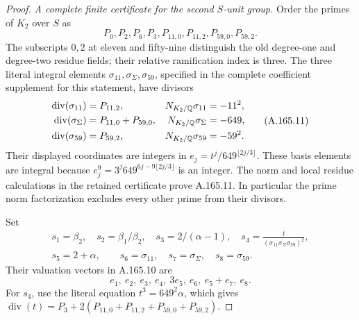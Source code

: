 \begin{proof}
\emph{A complete finite certificate for the second \(S\)-unit group.}
Order the primes of \(K_2\) over \(S\) as
\[
  P_0,P_2,P_6,P_3,P_{11,0},P_{11,2},P_{59,0},P_{59,2}.
\tag{A.165.10}
\]
The subscripts \(0,2\) at eleven and fifty-nine distinguish the old
degree-one and degree-two residue fields; their relative ramification
index is three.
The three literal integral elements
\(\sigma_{11},\sigma_\Sigma,\sigma_{59}\), specified in the complete
coefficient supplement for this statement, have divisors
\[
 \begin{aligned}
 \operatorname{div}(\sigma_{11})&=P_{11,2},&
 N_{K_2/\mathbb Q}\sigma_{11}&=-11^2,\\
 \operatorname{div}(\sigma_\Sigma)&=P_{11,0}+P_{59,0},&
 N_{K_2/\mathbb Q}\sigma_\Sigma&=-649,\\
 \operatorname{div}(\sigma_{59})&=P_{59,2},&
 N_{K_2/\mathbb Q}\sigma_{59}&=-59^2.
 \end{aligned}
\tag{A.165.11}
\]
Their displayed coordinates are integers in
\(e_j=t^j/649^{\lfloor2j/3\rfloor}\).  These basis elements are integral
because \(e_j^9=3^j649^{6j-9\lfloor2j/3\rfloor}\) is an integer.
The norm and local residue calculations in the retained certificate
prove A.165.11.  In particular the prime norm factorization excludes
every other prime from their divisors.

Set
\[
\begin{gathered}
 s_1=\beta_2,\quad s_2=\beta_1/\beta_2,\quad
 s_3=2/(\alpha-1),\quad
 s_4=\frac{t}{(\sigma_{11}\sigma_\Sigma\sigma_{59})^2},\\
 s_5=2+\alpha,\qquad
 s_6=\sigma_{11},\quad s_7=\sigma_\Sigma,\quad s_8=\sigma_{59}.
\end{gathered}
\tag{A.165.12}
\]
Their valuation vectors in A.165.10 are
\[
 e_1,\ e_2,\ e_3,\ e_4,\ 3e_5,\ e_6,\ e_5+e_7,\ e_8.
\tag{A.165.13}
\]
For \(s_4\), use the literal equation \(t^3=649^2\alpha\), which gives
\(\operatorname{div}(t)=P_3+
2(P_{11,0}+P_{11,2}+P_{59,0}+P_{59,2})\).


\end{proof}

